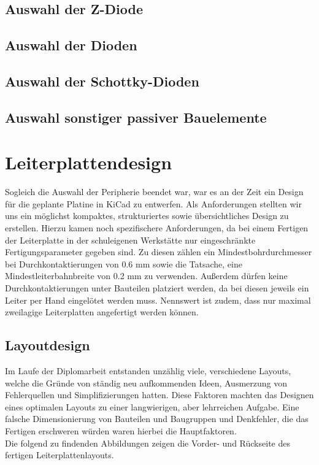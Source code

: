 \subsection{Auswahl der Z-Diode}

\subsection{Auswahl der Dioden}

\subsection{Auswahl der Schottky-Dioden}

\subsection{Auswahl sonstiger passiver Bauelemente}


\newpage
\section{Leiterplattendesign}

Sogleich die Auswahl der Peripherie beendet war, war es an der Zeit ein Design für die geplante Platine in KiCad zu entwerfen.
Als Anforderungen stellten wir uns ein möglichst kompaktes, strukturiertes sowie übersichtliches Design zu erstellen.
Hierzu kamen noch spezifischere Anforderungen, da bei einem Fertigen der Leiterplatte in der schuleigenen Werkstätte nur eingeschränkte Fertigungsparameter gegeben sind.
Zu diesen zählen ein Mindestbohrdurchmesser bei Durchkontaktierungen von 0.6 mm sowie die Tatsache, eine Mindestleiterbahnbreite von 0.2 mm zu verwenden.
Außerdem dürfen keine Durchkontaktierungen unter Bauteilen platziert werden, da bei diesen jeweils ein Leiter per Hand eingelötet werden muss.
Nennswert ist zudem, dass nur maximal zweilagige Leiterplatten angefertigt werden können.

\subsection{Layoutdesign}

Im Laufe der Diplomarbeit entstanden unzählig viele, verschiedene Layouts, welche die Gründe von ständig neu aufkommenden Ideen, Ausmerzung von Fehlerquellen und Simplifizierungen hatten.
Diese Faktoren machten das Designen eines optimalen Layouts zu einer langwierigen, aber lehrreichen Aufgabe.
Eine falsche Dimensionierung von Bauteilen und Baugruppen und Denkfehler, die das Fertigen erschweren würden waren hierbei die Hauptfaktoren. \\
Die folgend zu findenden Abbildungen zeigen die Vorder- und Rückseite des fertigen Leiterplattenlayouts.

